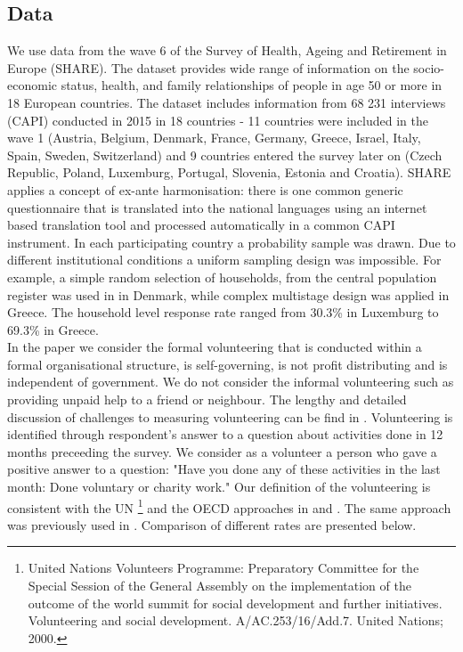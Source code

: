 \documentclass[10pt, letterpaper]{article}
\begin{document}
\begin{spacing}{1.4}
\section{Data}

We use data from the wave 6 of the Survey of Health, Ageing and Retirement in Europe (SHARE). The dataset provides wide range of information on the socio-economic status, health, and family relationships of people in age 50 or more in 18 European countries. The dataset includes information from 68 231 interviews (CAPI) conducted in 2015 in 18 countries - 11 countries were included in the wave 1 (Austria, Belgium, Denmark, France, Germany, Greece, Israel, Italy, Spain, Sweden, Switzerland) and 9 countries entered the survey later on (Czech Republic, Poland, Luxemburg,  Portugal, Slovenia, Estonia and Croatia). SHARE applies a concept of ex-ante harmonisation: there is one common generic questionnaire that is translated into the national languages using an internet based translation tool and processed automatically in a common CAPI instrument. In each participating country a probability sample was drawn. Due to different institutional conditions a uniform sampling design was impossible. For example, a simple random selection of households, from the central population register was used in in Denmark, while complex multistage design was applied in Greece. The  household level response rate ranged from 30.3\% in Luxemburg to 69.3\% in Greece. \citet{bergmann17} \\
In the paper we consider the formal volunteering that is conducted within a formal organisational structure, is self-governing, is not profit distributing and is independent of government. We do not consider the informal volunteering such as providing unpaid help to a friend or neighbour. The lengthy and detailed discussion of challenges to measuring volunteering can be find in \citet{salomon2017}. Volunteering is identified through respondent's answer to a question about activities done in 12 months preceeding the survey. We consider as a volunteer a person who gave a positive answer to a question: "Have you done any of these activities in the last month: Done voluntary or charity work."  Our definition of the volunteering is consistent with the UN \footnote{United Nations Volunteers Programme: Preparatory Committee for the Special Session of the General Assembly on the implementation of the outcome of the world summit for social development and further initiatives. Volunteering and social development. A/AC.253/16/Add.7. United Nations; 2000.} and the OECD approaches in \citet{Oecd15} and \citet{Oecd16}. The same approach was previously used in \citet{haski09}. Comparison of different rates are presented below. \\ 


\end{spacing}
\end{document}
